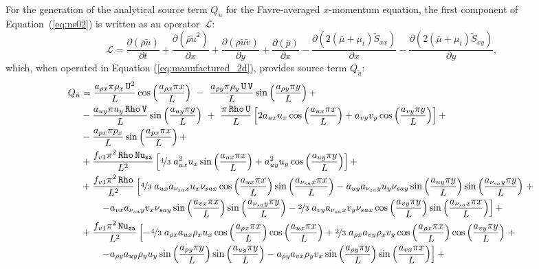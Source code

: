 \documentclass[10pt]{article}
\newcommand{\Diff}[2] {\dfrac{\partial( #1)}{\partial #2}}
\newcommand{\Rho}{\,\mathtt{Rho}}
\newcommand{\U}{\,\mathtt{U}}
\newcommand{\V}{\,\mathtt{V}}
\newcommand{\Nu}{\,\mathtt{Nu_{sa}}}
\newcommand{\Lo}{\,\mathcal{L}}
\newcommand{\brho}{\bar{\rho}}
\newcommand{\bp}{\bar{p}}
\newcommand{\tu}{\tilde{u}}
\newcommand{\tv}{\tilde{v}}
\newcommand{\tS}{\tilde{S}}
\newcommand{\bmu}{\bar{\mu}}
\begin{document}
For the generation of the analytical source term $Q_{\tu}$ for the Favre-averaged $x$-momentum equation, the first component of Equation~(\ref{eq:ns02}) is written as an  operator $\Lo$:
\begin{equation*}
 \Lo= \Diff{\brho \tu}{t} +\Diff{\brho \tu^2 }{x}+\Diff{\brho \tu\tv}{y} +\Diff{\bp}{x}-\Diff{2(\bmu+\mu_t)\tS_{xx}}{x}-\Diff{2(\bmu+\mu_t)\tS_{xy}}{y},
\end{equation*}
which, when operated in Equation (\ref{eq:manufactured_2d}), provides source term $Q_{\tu}$:
\begin{equation}
 \begin{split}
 Q_{\tu} &= \dfrac{a_{\rho x} \pi \rho_x \U^2 }{L} \cos\left(\dfrac{a_{\rho x} \pi x}{L}\right) \,\,-\,\,\dfrac{a_{\rho y} \pi \rho_y \U \V  }{L}\sin\left(\dfrac{a_{\rho y} \pi y}{L}\right)+ \\
&-\dfrac{a_{uy} \pi u_y \Rho \V  }{L}\sin\left(\dfrac{a_{uy} \pi y}{L}\right)\,\,+\,\, \dfrac{\pi \Rho \U}{L}\left[2 a_{ux} u_x  \cos\left(\dfrac{a_{ux} \pi x}{L}\right)+a_{vy} v_y  \cos\left(\dfrac{a_{vy} \pi y}{L}\right)\right]+ \\
&-\dfrac{a_{px} \pi p_x  }{L}\sin\left(\dfrac{a_{px} \pi x}{L}\right)+ \\
&+\dfrac{f_{v1} \pi^2 \Rho \Nu}{L^2}\left[\nicefrac{4}{3} \; a_{ux}^2 u_x  \sin\left(\dfrac{a_{ux} \pi x}{L}\right)+a_{uy}^2 u_y  \cos\left(\dfrac{a_{uy} \pi y}{L}\right)\right] + \\
&+\dfrac{f_{v1} \pi^2 \Rho}{L^2}\left[\nicefrac{4}{3} \; a_{ux} a_{\nu_{sa} x} u_x \nu_{sa x}  \cos\left(\dfrac{a_{ux} \pi x}{L}\right)  \sin\left(\dfrac{a_{\nu_{sa} x} \pi x}{L}\right)- a_{uy} a_{\nu_{sa} y} u_y \nu_{sa y} \sin\left(\dfrac{a_{uy} \pi y}{L}\right)  \sin\left(\dfrac{a_{\nu_{sa} y} \pi y}{L}\right)\right.+\\
    &\qquad\left.- a_{vx} a_{\nu_{sa} y} v_x \nu_{sa y} \sin\left(\dfrac{a_{vx} \pi x}{L}\right)  \sin\left(\dfrac{a_{\nu_{sa} y} \pi y}{L}\right)-\nicefrac{2}{3} \;  a_{vy} a_{\nu_{sa} x} v_y \nu_{sa x} \cos\left(\dfrac{a_{vy} \pi y}{L}\right)  \sin\left(\dfrac{a_{\nu_{sa} x} \pi x}{L}\right)\right] + \\
&+\dfrac{f_{v1} \pi^2 \Nu}{L^2}\left[-\nicefrac{4}{3} \; a_{\rho x} a_{ux} \rho_x u_x  \cos\left(\dfrac{a_{\rho x} \pi x}{L}\right)  \cos\left(\dfrac{a_{ux} \pi x}{L}\right)+\nicefrac{2}{3} \; a_{\rho x} a_{vy} \rho_x v_y  \cos\left(\dfrac{a_{\rho x} \pi x}{L}\right)  \cos\left(\dfrac{a_{vy} \pi y}{L}\right)\right.+\\
    &\qquad\left.-a_{\rho y} a_{uy} \rho_y u_y  \sin\left(\dfrac{a_{\rho y} \pi y}{L}\right)  \sin\left(\dfrac{a_{uy} \pi y}{L}\right)-a_{\rho y} a_{vx} \rho_y v_x  \sin\left(\dfrac{a_{\rho y} \pi y}{L}\right)  \sin\left(\dfrac{a_{vx} \pi x}{L}\right)\right] + \\

\end{split}
\end{equation}
\end{document}
